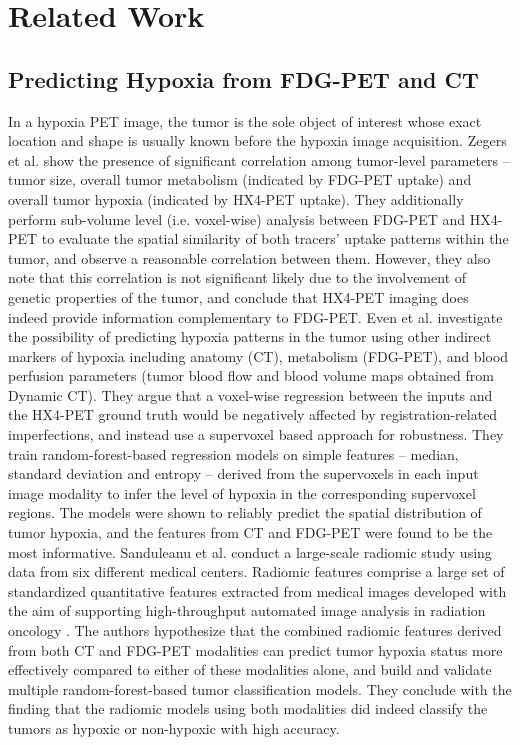 \chapter{Related Work}
\label{Related_Work}



\section{Predicting Hypoxia from FDG-PET and CT}
\label{Related_Work-hypoxia_prediction}
In a hypoxia PET image, the tumor is the sole object of interest whose exact location and shape is usually known before the hypoxia image acquisition. Zegers et al. \cite{zegers2014vivo} show the presence of significant correlation among tumor-level parameters -- tumor size, overall tumor metabolism (indicated by FDG-PET uptake) and overall tumor hypoxia (indicated by HX4-PET uptake). They additionally perform sub-volume level (i.e. voxel-wise) analysis between FDG-PET and HX4-PET to evaluate the spatial similarity of both tracers' uptake patterns within the tumor, and observe a reasonable correlation between them. However, they also note that this correlation is not significant likely due to the involvement of genetic properties of the tumor, and conclude that HX4-PET imaging does indeed provide information complementary to FDG-PET. Even et al. \cite{even2017predicting} investigate the possibility of predicting hypoxia patterns in the tumor using other indirect markers of hypoxia including anatomy (CT), metabolism (FDG-PET), and blood perfusion parameters (tumor blood flow and blood volume maps obtained from Dynamic CT). They argue that a voxel-wise regression between the inputs and the HX4-PET ground truth would be negatively affected by registration-related imperfections, and instead use a supervoxel based approach for robustness. They train random-forest-based regression models on simple features -- median, standard deviation and entropy -- derived from the supervoxels in each input image modality to infer the level of hypoxia in the corresponding supervoxel regions. The models were shown to reliably predict the spatial distribution of tumor hypoxia, and the features from CT and FDG-PET were found to be the most informative. Sanduleanu et al. \cite{sanduleanu2020non} conduct a large-scale radiomic study using data from six different medical centers. Radiomic features comprise a large set of standardized quantitative features extracted from medical images developed with the aim of supporting high-throughput automated image analysis in radiation oncology \cite{aerts2014decoding}. The authors hypothesize that the combined radiomic features derived from both CT and FDG-PET modalities can predict tumor hypoxia status more effectively compared to either of these modalities alone, and build and validate multiple random-forest-based tumor classification models. They conclude with the finding that the radiomic models using both modalities did indeed classify the tumors as hypoxic or non-hypoxic with high accuracy.

